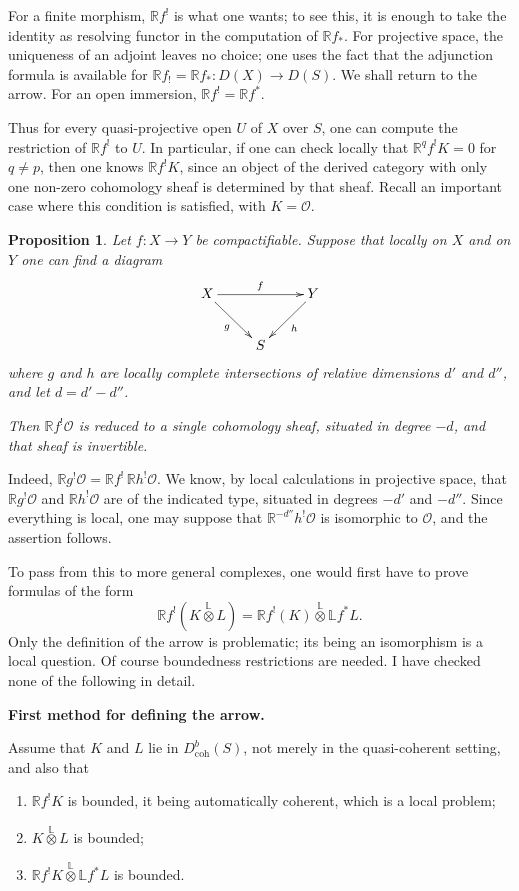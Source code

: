 \documentclass[12pt]{amsart}
\theoremstyle{plain}
\newtheorem{prop}{Proposition}
\theoremstyle{definition}
\newcommand{\coh}{\text{coh}}
\newcommand{\cO}{\mathcal{O}}
\newcommand{\cDb}{D^{b}}
\newcommand{\cD}{D}
\newcommand{\bR}{\mathbb{R}}
\newcommand{\bL}{\mathbb{L}}
\begin{document}
For a finite morphism, $\bR f^!$ is what one wants; to see this, it is enough to take the identity as resolving functor in the computation of $\bR f_*$. For projective space, the uniqueness of an adjoint leaves no choice; one uses the fact that the adjunction formula is available for $\bR f_!=\bR f_*:\cD(X)\to\cD(S)$. We shall return to the arrow. For an open immersion, $\bR f^!=\bR f^*$.

Thus for every quasi-projective open $U$ of $X$ over $S$, one can compute the restriction of $\bR f^!$ to $U$. In particular, if one can check locally that $\bR^qf^!K=0$ for $q\ne p$, then one knows $\bR f^!K$, since an object of the derived category with only one non-zero cohomology sheaf is determined by that sheaf. Recall an important case where this condition is satisfied, with $K=\cO$.

\begin{prop}
Let $f:X\to Y$ be compactifiable. Suppose that locally on $X$ and on $Y$ one can find a diagram
\[
\xymatrix{
X \ar[rr]^f \ar[dr]_g && Y \ar[dl]^h \\
& S &
}
\]
where $g$ and $h$ are locally complete intersections of relative dimensions $d'$ and $d''$, and let $d=d'-d''$.

Then $\bR f^!\cO$ is reduced to a single cohomology sheaf, situated in degree $-d$, and that sheaf is invertible.
\end{prop}

Indeed, $\bR g^!\cO=\bR f^!\,\bR h^!\cO$. We know, by local calculations in projective space, that $\bR g^!\cO$ and $\bR h^!\cO$ are of the indicated type, situated in degrees $-d'$ and $-d''$. Since everything is local, one may suppose that $\bR^{-d''}h^!\cO$ is isomorphic to $\cO$, and the assertion follows.

To pass from this to more general complexes, one would first have to prove formulas of the form
\[
\bR f^!(K\overset{\mathbb L}{\otimes}L)=\bR f^!(K)\overset{\mathbb L}{\otimes}\bL f^*L.
\]
Only the definition of the arrow is problematic; its being an isomorphism is a local question. Of course boundedness restrictions are needed. I have checked none of the following in detail.

\textbf{First method for defining the arrow.}

Assume that $K$ and $L$ lie in $\cDb_{\coh}(S)$, not merely in the quasi-coherent setting, and also that
\begin{enumerate}
\item[(a)] $\bR f^!K$ is bounded, it being automatically coherent, which is a local problem;
\item[(b)] $K\overset{\mathbb L}{\otimes}L$ is bounded;
\item[(c)] $\bR f^!K\overset{\mathbb L}{\otimes}\bL f^*L$ is bounded.
\end{enumerate}
\end{document}
